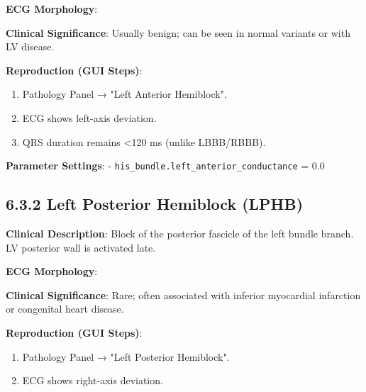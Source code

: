 \documentclass[12pt,oneside,a4paper]{book}
\newcommand{\code}[1]{\texttt{#1}}
\begin{document}
\textbf{ECG Morphology}:

\textbf{Clinical Significance}:
Usually benign; can be seen in normal variants or with LV disease.

\textbf{Reproduction (GUI Steps)}:
\begin{enumerate}
  \item Pathology Panel → "Left Anterior Hemiblock".
  \item ECG shows left-axis deviation.
  \item QRS duration remains \textless 120 ms (unlike LBBB/RBBB).
\end{enumerate}

\textbf{Parameter Settings}:
- \code{his\_bundle.left\_anterior\_conductance} = 0.0

\subsection{6.3.2 Left Posterior Hemiblock (LPHB)}

\textbf{Clinical Description}:
Block of the posterior fascicle of the left bundle branch. LV posterior wall is activated late.

\textbf{ECG Morphology}:

\textbf{Clinical Significance}:
Rare; often associated with inferior myocardial infarction or congenital heart disease.

\textbf{Reproduction (GUI Steps)}:
\begin{enumerate}
  \item Pathology Panel → "Left Posterior Hemiblock".
  \item ECG shows right-axis deviation.
\end{enumerate}
\end{document}
